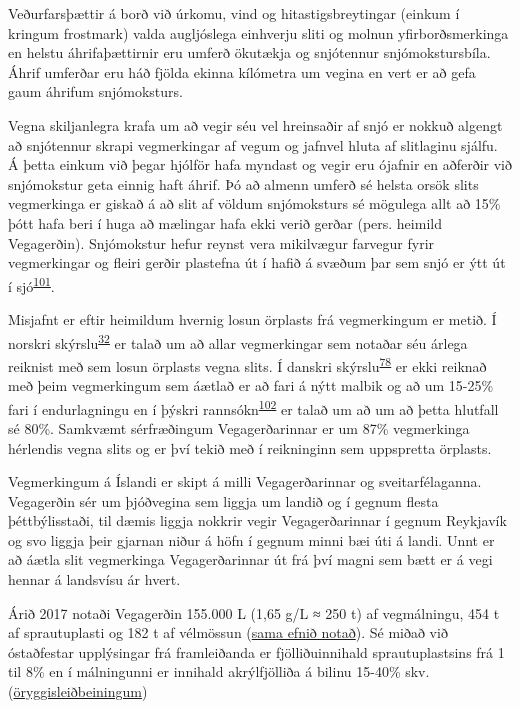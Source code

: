\documentclass[icelandic,]{book}
\begin{document}
Veðurfarsþættir á borð við úrkomu, vind og hitastigsbreytingar (einkum í kringum frostmark) valda augljóslega einhverju sliti og molnun yfirborðsmerkinga en helstu áhrifaþættirnir eru umferð ökutækja og snjótennur snjómokstursbíla. Áhrif umferðar eru háð fjölda ekinna kílómetra um vegina en vert er að gefa gaum áhrifum snjómoksturs.

Vegna skiljanlegra krafa um að vegir séu vel hreinsaðir af snjó er nokkuð algengt að snjótennur skrapi vegmerkingar af vegum og jafnvel hluta af slitlaginu sjálfu. Á þetta einkum við þegar hjólför hafa myndast og vegir eru ójafnir en aðferðir við snjómokstur geta einnig haft áhrif. Þó að almenn umferð sé helsta orsök slits vegmerkinga er giskað á að slit af völdum snjómoksturs sé mögulega allt að 15\% þótt hafa beri í huga að mælingar hafa ekki verið gerðar (pers. heimild Vegagerðin). Snjómokstur hefur reynst vera mikilvægur farvegur fyrir vegmerkingar og fleiri gerðir plastefna út í hafið á svæðum þar sem snjó er ýtt út í sjó\textsuperscript{\protect\hyperlink{ref-BaztanJ2018}{101}}.

Misjafnt er eftir heimildum hvernig losun örplasts frá vegmerkingum er metið. Í norskri skýrslu\textsuperscript{\protect\hyperlink{ref-sundt2014sources}{32}} er talað um að allar vegmerkingar sem notaðar séu árlega reiknist með sem losun örplasts vegna slits. Í danskri skýrslu\textsuperscript{\protect\hyperlink{ref-lassen2015microplastics}{78}} er ekki reiknað með þeim vegmerkingum sem áætlað er að fari á nýtt malbik og að um 15-25\% fari í endurlagningu en í þýskri rannsókn\textsuperscript{\protect\hyperlink{ref-Commission2009}{102}} er talað um að um að þetta hlutfall sé 80\%. Samkvæmt sérfræðingum Vegagerðarinnar er um 87\% vegmerkinga hérlendis vegna slits og er því tekið með í reikninginn sem uppspretta örplasts.

Vegmerkingum á Íslandi er skipt á milli Vegagerðarinnar og sveitarfélaganna. Vegagerðin sér um þjóðvegina sem liggja um landið og í gegnum flesta þéttbýlisstaði, til dæmis liggja nokkrir vegir Vegagerðarinnar í gegnum Reykjavík og svo liggja þeir gjarnan niður á höfn í gegnum minni bæi úti á landi. Unnt er að áætla slit vegmerkinga Vegagerðarinnar út frá því magni sem bætt er á vegi hennar á landsvísu ár hvert.

Árið 2017 notaði Vegagerðin 155.000 L (1,65 g/L ≈ 250 t) af vegmálningu, 454 t af sprautuplasti og 182 t af vélmössun (\href{https://www.geveko-markings.com/fileadmin/root/msds/Thermoplastics/ViaTherm/MSDS_ViaTherm_hydrocarbon_EN-GB.pdf}{sama efnið notað}). Sé miðað við óstaðfestar upplýsingar frá framleiðanda er fjölliðuinnihald sprautuplastsins frá 1 til 8\% en í málningunni er innihald akrýlfjölliða á bilinu 15-40\% skv.(\href{\%22/skjol/Mercalin\%20AQ\%20white\%206010\%20vatnsmálning\%20CLEANOSOL-3.pdf\%22}{öryggisleiðbeiningum})
\end{document}
